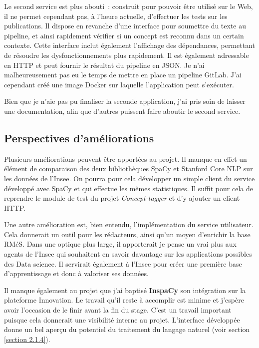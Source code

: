 Le second service est plus abouti~: construit pour pouvoir être utilisé sur le Web, il ne permet cependant pas, à l'heure actuelle, d'effectuer les tests sur les publications. Il dispose en revanche d'une interface pour soumettre du texte au pipeline, et ainsi rapidement vérifier si un concept est reconnu dans un certain contexte. Cette interface inclut également l'affichage des dépendances, permettant de résoudre les dysfonctionnements plus rapidement. Il est également adressable en HTTP et peut fournir le résultat du pipeline en JSON. Je n'ai malheureusement pas eu le temps de mettre en place un pipeline GitLab. J'ai cependant créé une image Docker sur laquelle l'application peut s'exécuter.
\newline

Bien que je n'aie pas pu finaliser la seconde application, j'ai pris soin de laisser une documentation, afin que d'autres puissent faire aboutir le second service. 

\subsection{Perspectives d'améliorations}

Plusieurs améliorations peuvent être apportées au projet. Il manque en effet un élément de comparaison des deux bibliothèques SpaCy et Stanford Core NLP sur les données de l'Insee. On pourra pour cela développer un simple client du service développé avec SpaCy et qui effectue les mêmes statistiques. Il suffit pour cela de reprendre le module de test du projet \textit{Concept-tagger} et d'y ajouter un client HTTP.
\newline

Une autre amélioration est, bien entendu, l'implémentation du service utilisateur. Cela donnerait un outil pour les rédacteurs, ainsi qu'un moyen d'enrichir la base RMéS. Dans une optique plus large, il apporterait je pense un vrai plus aux agents de l'Insee qui souhaitent en savoir davantage sur les applications possibles des Data science. Il servirait également à l'Insee pour créer une première base d'apprentissage et donc à valoriser ses données.
\newline

Il manque également au projet que j'ai baptisé \textbf{InspaCy} son intégration sur la plateforme Innovation. Le travail qu'il reste à accomplir est minime et j'espère avoir l'occasion de le finir avant la fin du stage. C'est un travail important puisque cela donnerait une visibilité interne au projet. L'interface développée donne un bel aperçu du potentiel du traitement du langage naturel (voir section \ref{section 2.1.4}).
\newline

